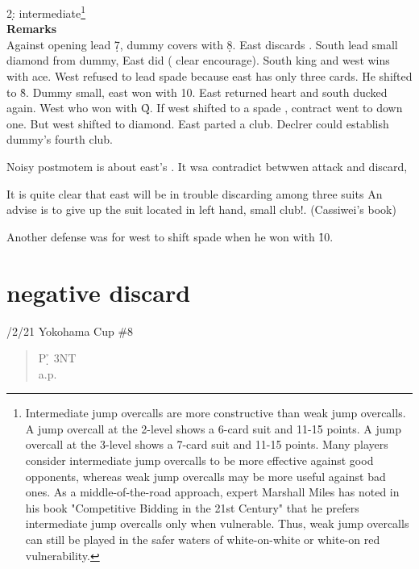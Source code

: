 
2\d : intermediate\footnote{
Intermediate jump overcalls are more constructive than weak jump overcalls. A jump overcall at the 2-level shows a 6-card suit and 11-15 points. A jump overcall at the 3-level shows a 7-card suit and 11-15 points.
Many players consider intermediate jump overcalls to be more effective against good opponents, whereas weak jump overcalls may be more useful against bad ones. As a middle-of-the-road approach, expert Marshall Miles has noted in his book "Competitive Bidding in the 21st Century" that he prefers intermediate jump overcalls only when vulnerable. Thus, weak jump overcalls can still be played in the safer waters of white-on-white or white-on red vulnerability.}\\

{\bf Remarks}\\

Against opening lead \d 7, dummy covers with \d 8. East discards .
South lead small diamond from dummy, East did ( clear encourage).
South king and west wins with ace. West refused to lead spade because
east has only three cards. He shifted to \h 8. Dummy small, east won
with 10. East returned heart and south ducked again. West who won
with \h Q. If west shifted to a spade , contract went to down one.
But west shifted to diamond. East parted a club. Declrer could
establish dummy's fourth club.

Noisy postmotem is about east's . It wsa contradict betwwen
attack and discard,

It is quite clear that east will be in trouble discarding 
among three suits An advise is to give up the suit located in
left hand, small club!. (Cassiwei's book)


 Another defense was for west to shift spade when he won with \h10.





\section{negative discard}

/2/21 Yokohama Cup \#8
\begin{quote}
%
  {}%
  {}
  {}%
  {}%
\end{quote}
\begin{quote}
\begin{bidding}
P \d   {}\h  \> 3NT\\
a.p.
\end{bidding}
\end{quote}

